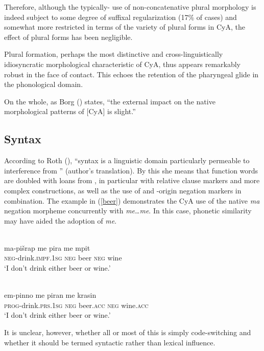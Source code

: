 \documentclass[output=paper]{langsci/langscibook}
\begin{document}
Therefore, although the typically- use of {non-concatenative} plural morphology is indeed subject to some degree of suffixal regularization (17\% of cases) and somewhat more restricted in terms of the variety of plural forms in CyA, the effect of  plural forms has been negligible.

Plural {formation}, perhaps the most distinctive and cross-linguistically idiosyncratic morphological characteristic of CyA, thus appears remarkably robust in the face of contact. This echoes the retention of the {pharyngeal} glide in the phonological domain.

On the whole, as Borg (\citeyear[57]{Borg1994}) states, “the external impact on the native morphological patterns of [CyA] is slight.”

\subsection{Syntax}

According to Roth (\citeyear[70]{Roth2004}), “syntax is a linguistic domain particularly permeable to interference from ” (author’s translation). By this she means that function words are doubled with loans from , in particular with {relative} clause markers and more complex constructions, as well as the use of  and -origin {negation} markers in combination. The example in (\ref{beer}) demonstrates the CyA use of the native \textit{ma} {negation} morpheme concurrently with  \textit{me}…\textit{me}. In this case, phonetic similarity may have aided the adoption of \textit{me}.


\ea\label{beer}
 {\citealt[149]{Borg1985}}\\
\gll ma-pišrap me pira me mpit\\
    \textsc{neg}-drink.\textsc{impf.1sg} \textsc{neg} beer \textsc{neg} wine  \\
\glt ‘I don’t drink either beer or wine.’

\ex
{}\\
\gll em-pinno me piran me krasin\\
    \textsc{prog}-drink.\textsc{prs.1sg} \textsc{neg}  beer.\textsc{acc} \textsc{neg} wine.\textsc{acc} \\
\glt ‘I don’t drink either beer or wine.’
\z
\z

It is unclear, however, whether all or most of this is simply {code-switching} and whether it should be termed syntactic rather than lexical influence.
\end{document}
